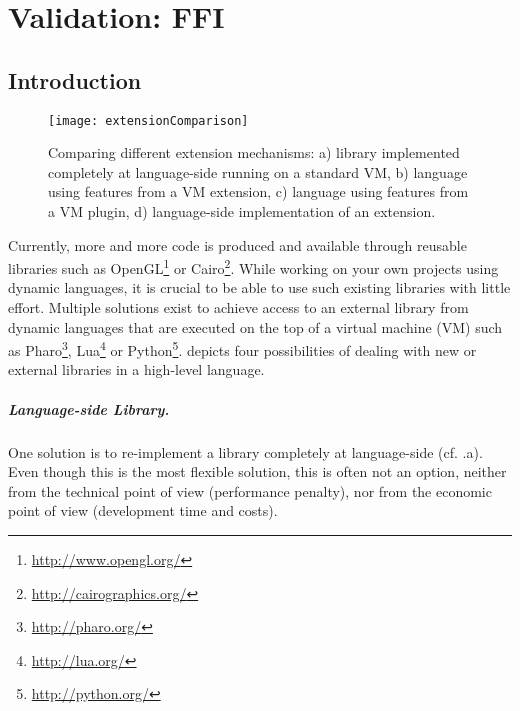 

\chapter{Validation: FFI}
\minitoc

\section{Introduction}

\begin{figure*}[ht]
	\centering
	\texttt{[image: extensionComparison]}
	\caption{Comparing different extension mechanisms: a) library implemented completely at language-side running on a standard VM, b) language using features from a VM extension, c) language using features from a VM plugin, d) language-side implementation of an extension.}
\end{figure*}

Currently, more and more code is produced and available through reusable libraries such as OpenGL\footnote{\url{http://www.opengl.org/}} or Cairo\footnote{\url{http://cairographics.org/}}.
While working on your own projects using dynamic languages, it is crucial to be able to use such existing libraries with little effort.
Multiple solutions exist to achieve access to an external library from dynamic languages that are executed on the top of a virtual machine (VM) such as Pharo\footnote{\url{http://pharo.org/}}, Lua\footnote{\url{http://lua.org/}} or Python\footnote{\url{http://python.org/}}.
 depicts four possibilities of dealing with new or external libraries in a high-level language.

\paragraph{Language-side Library.}
One solution is to re-implement a library completely at language-side (cf. .a).
Even though this is the most flexible solution, this is often not an option, neither from the technical point of view (performance penalty), nor from the economic point of view (development time and costs).


